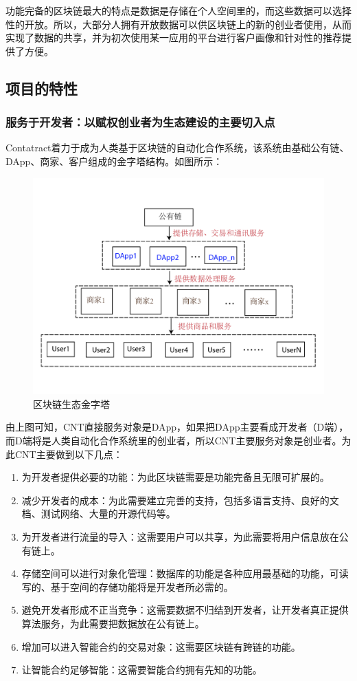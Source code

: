 \documentclass[a4paper,12pt]{article}
\begin{document}
功能完备的区块链最大的特点是数据是存储在个人空间里的，而这些数据可以选择性的开放。所以，大部分人拥有开放数据可以供区块链上的新的创业者使用，从而实现了数据的共享，并为初次使用某一应用的平台进行客户画像和针对性的推荐提供了方便。

\subsection{项目的特性}

\subsubsection{服务于开发者：以赋权创业者为生态建设的主要切入点}

Contatract着力于成为人类基于区块链的自动化合作系统，该系统由基础公有链、DApp、商家、客户组成的金字塔结构。如图所示：


\begin {figure} [htbp]
\centering \includegraphics [width = 5in] {pic_cn/pyramid.png}
\caption {区块链生态金字塔} \label {fig: pyramid}
\end {figure}

由上图可知，CNT直接服务对象是DApp，如果把DApp主要看成开发者（D端），而D端将是人类自动化合作系统里的创业者，所以CNT主要服务对象是创业者。为此CNT主要做到以下几点：

\begin{enumerate}
\item 为开发者提供必要的功能：为此区块链需要是功能完备且无限可扩展的。
\item 减少开发者的成本：为此需要建立完善的支持，包括多语言支持、良好的文档、测试网络、大量的开源代码等。
\item 为开发者进行流量的导入：这需要用户可以共享，为此需要将用户信息放在公有链上。
\item 存储空间可以进行对象化管理：数据库的功能是各种应用最基础的功能，可读写的、基于空间的存储功能将是开发者所必需的。
\item 避免开发者形成不正当竞争：这需要数据不归结到开发者，让开发者真正提供算法服务，为此需要把数据放在公有链上。
\item 增加可以进入智能合约的交易对象：这需要区块链有跨链的功能。
\item 让智能合约足够智能：这需要智能合约拥有先知的功能。
\end{enumerate}
\end{document}
